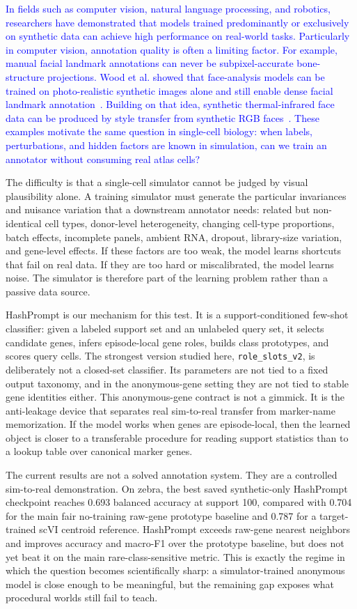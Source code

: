 \documentclass{article}
\newcommand{\phflo}[1]{\textcolor{blue}{#1}}
\begin{document}
\phflo{In fields such as computer vision, natural language processing, and robotics, researchers have demonstrated that models trained predominantly or exclusively on synthetic data can achieve high performance on real-world tasks. Particularly in computer vision, annotation quality is often a limiting factor. For example, manual facial landmark annotations can never be subpixel-accurate bone-structure projections. Wood et al. showed that face-analysis models can be trained on photo-realistic synthetic images alone and still enable dense facial landmark annotation~\cite{wood2021fake}. Building on that idea, synthetic thermal-infrared face data can be produced by style transfer from synthetic RGB faces~\cite{flotho2024t}. These examples motivate the same question in single-cell biology: when labels, perturbations, and hidden factors are known in simulation, can we train an annotator without consuming real atlas cells?}

The difficulty is that a single-cell simulator cannot be judged by visual plausibility alone. A training simulator must generate the particular invariances and nuisance variation that a downstream annotator needs: related but non-identical cell types, donor-level heterogeneity, changing cell-type proportions, batch effects, incomplete panels, ambient RNA, dropout, library-size variation, and gene-level effects. If these factors are too weak, the model learns shortcuts that fail on real data. If they are too hard or miscalibrated, the model learns noise. The simulator is therefore part of the learning problem rather than a passive data source.

HashPrompt is our mechanism for this test. It is a support-conditioned few-shot classifier: given a labeled support set and an unlabeled query set, it selects candidate genes, infers episode-local gene roles, builds class prototypes, and scores query cells. The strongest version studied here, \texttt{role\_slots\_v2}, is deliberately not a closed-set classifier. Its parameters are not tied to a fixed output taxonomy, and in the anonymous-gene setting they are not tied to stable gene identities either. This anonymous-gene contract is not a gimmick. It is the anti-leakage device that separates real sim-to-real transfer from marker-name memorization. If the model works when genes are episode-local, then the learned object is closer to a transferable procedure for reading support statistics than to a lookup table over canonical marker genes.

The current results are not a solved annotation system. They are a controlled sim-to-real demonstration. On zebra, the best saved synthetic-only HashPrompt checkpoint reaches 0.693 balanced accuracy at support 100, compared with 0.704 for the main fair no-training raw-gene prototype baseline and 0.787 for a target-trained scVI centroid reference. HashPrompt exceeds raw-gene nearest neighbors and improves accuracy and macro-F1 over the prototype baseline, but does not yet beat it on the main rare-class-sensitive metric. This is exactly the regime in which the question becomes scientifically sharp: a simulator-trained anonymous model is close enough to be meaningful, but the remaining gap exposes what procedural worlds still fail to teach.
\end{document}
